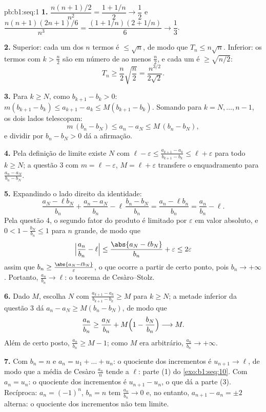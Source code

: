 \begin{solution}{pb:b1:seq:1}
\textbf{1.} $\dfrac{n(n+1)/2}{n^2} = \dfrac{1 + 1/n}{2} \to
\dfrac12$ e $\dfrac{n(n+1)(2n+1)/6}{n^3} = \dfrac{(1 +
1/n)(2 + 1/n)}{6} \to \dfrac13$.

\textbf{2.} Superior: cada um dos $n$ termos é $\leq \sqrt n$, de modo que
$T_n \leq n\sqrt n$. Inferior: os termos com $k > \frac n2$ são em
número de ao menos $\frac n2$, e cada um é $\geq \sqrt{n/2}$:
\[
T_n \geq \frac n2 \sqrt{\frac n2} = \frac{n^{3/2}}{2\sqrt 2} .
\]

\textbf{3.} Para $k \geq N$, como $b_{k+1} - b_k > 0$:
$m(b_{k+1} - b_k) \leq a_{k+1} - a_k \leq M(b_{k+1} - b_k)$.
Somando para $k = N, \dots, n - 1$, os dois lados telescopam:
\[
m\,(b_n - b_N) \leq a_n - a_N \leq M\,(b_n - b_N),
\]
e dividir por $b_n - b_N > 0$ dá a afirmação.

\textbf{4.} Pela definição de limite existe $N$ com $\ell -
\varepsilon \leq \frac{a_{k+1} - a_k}{b_{k+1} - b_k} \leq \ell +
\varepsilon$ para todo $k \geq N$; a questão 3 com $m = \ell -
\varepsilon$, $M = \ell + \varepsilon$ transfere o enquadramento
para $\frac{a_n - a_N}{b_n - b_N}$.

\textbf{5.} Expandindo o lado direito da identidade:
\[
\frac{a_N - \ell b_N}{b_n} + \frac{a_n - a_N}{b_n} -
\ell\,\frac{b_n - b_N}{b_n}
= \frac{a_n - \ell b_n}{b_n} = \frac{a_n}{b_n} - \ell .
\]
Pela questão 4, o segundo fator do produto é limitado por
$\varepsilon$ em valor absoluto, e $0 < 1 - \frac{b_N}{b_n}
\leq 1$ para $n$ grande, de modo que
\[
\Bigl|\frac{a_n}{b_n} - \ell\Bigr|
\leq \frac{\abs{a_N - \ell b_N}}{b_n} + \varepsilon
\leq 2\varepsilon
\]
assim que $b_n \geq \frac{\abs{a_N - \ell b_N}}{\varepsilon}$,
o que ocorre a partir de certo ponto, pois $b_n \to +\infty$. Portanto,
$\frac{a_n}{b_n} \to \ell$: o teorema de Cesàro--Stolz.

\textbf{6.} Dado $M$, escolha $N$ com $\frac{a_{k+1} -
a_k}{b_{k+1} - b_k} \geq M$ para $k \geq N$; a metade inferior da
questão 3 dá $a_n - a_N \geq M(b_n - b_N)$, de modo que
\[
\frac{a_n}{b_n} \geq \frac{a_N}{b_n} +
M\Bigl(1 - \frac{b_N}{b_n}\Bigr) \longrightarrow M .
\]
Além de certo posto, $\frac{a_n}{b_n} \geq M - 1$; como $M$ era
arbitrário, $\frac{a_n}{b_n} \to +\infty$.

\textbf{7.} Com $b_n = n$ e $a_n = u_1 + \dots + u_n$: o
quociente dos incrementos é $u_{n+1} \to \ell$, de modo que a média de
Cesàro $\frac{a_n}{n}$ tende a $\ell$: parte (1) do
\cref{exo:b1:seq:10}. Com $a_n = u_n$: o quociente dos incrementos
é $u_{n+1} - u_n$, o que dá a parte (3). Recíproca: $a_n = (-1)^n$,
$b_n = n$ tem $\frac{a_n}{b_n} \to 0$ e, no entanto, $a_{n+1} - a_n = \pm
2$ alterna: o quociente dos incrementos não tem limite.


\end{solution}

